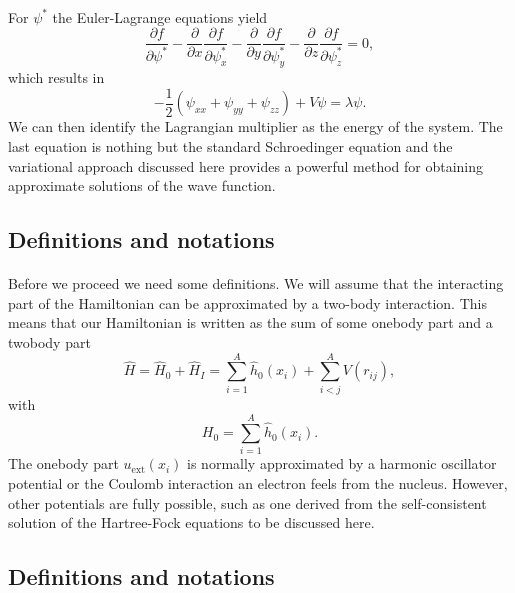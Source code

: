 \documentclass[%
twoside,                 %
final,                   %
10pt]{article}
\begin{document}
\paragraph{}
For $\psi^*$ the Euler-Lagrange  equations yield
\[
\frac{\partial f}{\partial \psi^*}- \frac{\partial }{\partial x}\frac{\partial f}{\partial \psi^*_x}-\frac{\partial }{\partial y}\frac{\partial f}{\partial \psi^*_y}-\frac{\partial }{\partial z}\frac{\partial f}{\partial \psi^*_z}=0,
\] 
which results in 
\[
    -\frac{1}{2}(\psi_{xx}+\psi_{yy}+\psi_{zz})+V\psi=\lambda \psi.
\]
We can then identify the  Lagrangian multiplier as the energy of the system. The last equation is 
nothing but the standard 
Schroedinger equation and the variational  approach discussed here provides 
a powerful method for obtaining approximate solutions of the wave function.






\subsection*{Definitions and notations}

\paragraph{}
Before we proceed we need some definitions.
We will assume that the interacting part of the Hamiltonian
can be approximated by a two-body interaction.
This means that our Hamiltonian is written as the sum of some onebody part and a twobody part
\begin{equation}
    \hat{H} = \hat{H}_0 + \hat{H}_I 
    = \sum_{i=1}^A \hat{h}_0(x_i) + \sum_{i < j}^A V(r_{ij}),
\label{Hnuclei}
\end{equation}
with 
\begin{equation}
  H_0=\sum_{i=1}^A \hat{h}_0(x_i).
\label{hinuclei}
\end{equation}
The onebody part $u_{\mathrm{ext}}(x_i)$ is normally approximated by a harmonic oscillator potential or the Coulomb interaction an electron feels from the nucleus. However, other potentials are fully possible, such as 
one derived from the self-consistent solution of the Hartree-Fock equations to be discussed here.




\subsection*{Definitions and notations}
\end{document}

